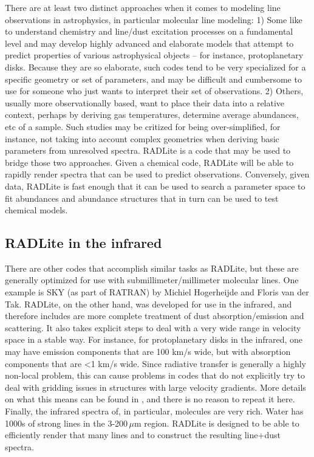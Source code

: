 \documentclass[11pt]{article}
\begin{document}
There are at least two distinct approaches when it comes to modeling line observations in astrophysics, in particular molecular
line modeling: 1) Some like to understand chemistry and line/dust excitation processes on a fundamental level and may develop
highly advanced and elaborate models that attempt to predict properties of various astrophysical objects -- for instance, protoplanetary disks. 
Because they are so elaborate, such codes tend to be very specialized for a specific geometry or set of parameters, and may be difficult and cumbersome to 
use for someone who just wants to interpret their set of observations. 2) Others, usually more observationally based, want to place their
data into a relative context, perhaps by deriving gas temperatures, determine average abundances, etc of a sample. Such studies may be critized for being over-simplified, 
for instance, not taking into account complex geometries when deriving basic parameters from unresolved spectra. RADLite is a code that may be 
used to bridge those two approaches. Given a chemical code, RADLite will be able to rapidly render spectra that can be used to predict observations. 
Conversely, given data, RADLite is fast enough that it can be used to search a parameter space to fit abundances and abundance structures that in turn
can be used to test chemical models. 

\subsection{RADLite in the infrared}

There are other codes that accomplish similar tasks as RADLite, but these are generally optimized for use with submillimeter/millimeter molecular lines. 
One example is SKY (as part of RATRAN) by Michiel Hogerheijde and Floris van der Tak. RADLite, on the other hand, was developed for use in the infrared, 
and therefore includes are more complete treatment of dust absorption/emission and scattering. It also takes explicit steps to deal with a very wide
range in velocity space in a stable way. For instance, for protoplanetary disks in the infrared, one may have emission components that are 100 km/s wide, 
but with absorption components that are <1 km/s wide. Since radiative transfer is generally a highly non-local problem, this can cause 
problems in codes that do not explicitly try to deal with gridding issues in structures with large velocity gradients. More details
on what this means can be found in \cite{Pontoppidan09}, and there is no reason to repeat it here. Finally, the infrared spectra of, in particular, 
molecules are very rich. Water has 1000s of strong lines in the 3-200\,$\mu$m region. RADLite is designed to be able to efficiently render that many lines and
to construct the resulting line+dust spectra. 
\end{document}
